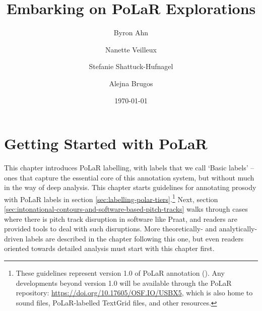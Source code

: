 \documentclass[11pt, twoside]{memoir}
\def\THIStitle{Embarking on PoLaR Explorations}
\def\THISsubtitle{A Framework for Intonational Annotation and Analysis}
\begin{document}
\frontmatter
{}
\title{\THIStitle}
\author{Byron Ahn \and Nanette Veilleux \and Stefanie Shattuck-Hufnagel \and Alejna Brugos}
\date{\today}
\tableofcontents
\newpage
\listoffigures
\listoftables
\newpage
\mainmatter
\chapter{Getting Started with PoLaR}\label{ch:basics}
This chapter introduces PoLaR labelling, with labels that we call ‘Basic labels’ – ones that capture the essential core of this annotation system, but without much in the way of deep analysis. This chapter starts guidelines for annotating prosody with PoLaR labels in section  \ref{sec:labelling-polar-tiers}.\footnote{These guidelines represent version 1.0 of PoLaR annotation (\citealt{ahn-21}). Any developments beyond version 1.0 will be available through the PoLaR repository: \href{https://doi.org/10.17605/OSF.IO/USBX5}{https://doi.org/10.17605/OSF.IO/USBX5}, which is also home to sound files, PoLaR-labelled TextGrid files, and other resources.} Next, section \ref{sec:intonational-contours-and-software-based-pitch-tracks} walks through cases where there is pitch track disruption in software like Praat, and readers are provided tools to deal with such disruptions. More theoretically- and analytically-driven labels are described in the chapter following this one, but even readers oriented towards detailed analysis must start with this chapter first.
\end{document}
